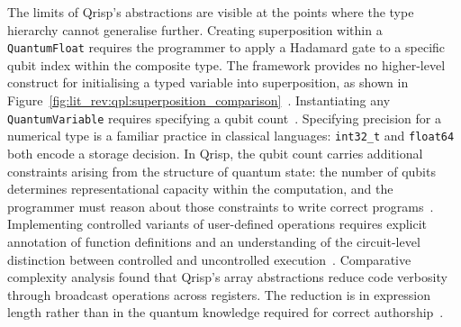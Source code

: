 The limits of Qrisp's abstractions are visible at the points where the type hierarchy cannot generalise further.
Creating superposition within a \texttt{QuantumFloat} requires the programmer to apply a Hadamard gate to a specific qubit index within the composite type.
The framework provides no higher-level construct for initialising a typed variable into superposition, as shown in Figure~\ref{fig:lit_rev:qpl:superposition_comparison}~\cite{seidel2024qrisp}.
Instantiating any \texttt{QuantumVariable} requires specifying a qubit count~\cite{seidel2024qrisp}.
Specifying precision for a numerical type is a familiar practice in classical languages: \texttt{int32\_t} and \texttt{float64} both encode a storage decision.
In Qrisp, the qubit count carries additional constraints arising from the structure of quantum state: the number of qubits determines representational capacity within the computation, and the programmer must reason about those constraints to write correct programs~\cite{seidel2024qrisp}.
Implementing controlled variants of user-defined operations requires explicit annotation of function definitions and an understanding of the circuit-level distinction between controlled and uncontrolled execution~\cite{seidel2024qrisp}.
Comparative complexity analysis found that Qrisp's array abstractions reduce code verbosity through broadcast operations across registers.
The reduction is in expression length rather than in the quantum knowledge required for correct authorship~\cite{corralesgarro2025productivityexpressiveness}.

